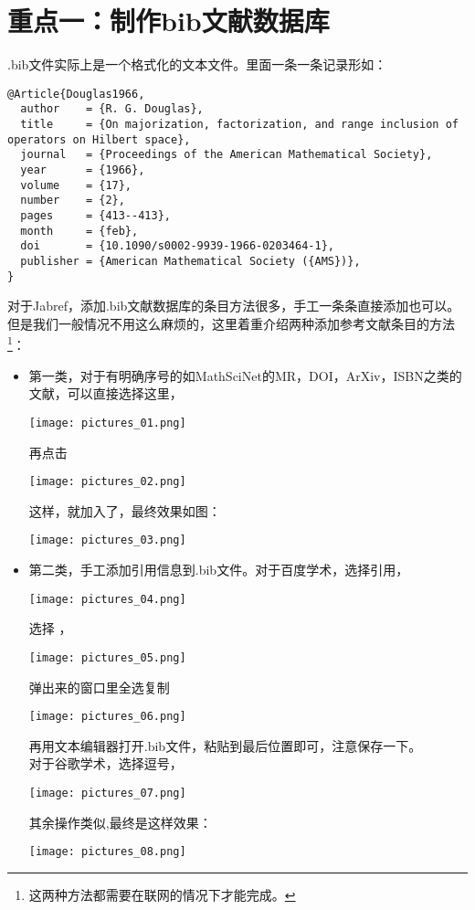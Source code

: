 \documentclass[cn,geye,cyan,normal,14pt]{elegantnote}
\begin{document}
\section{重点一：制作bib文献数据库}
.bib文件实际上是一个格式化的文本文件。里面一条一条记录形如：
\begin{lstlisting}
@Article{Douglas1966,
  author    = {R. G. Douglas},
  title     = {On majorization, factorization, and range inclusion of operators on Hilbert space},
  journal   = {Proceedings of the American Mathematical Society},
  year      = {1966},
  volume    = {17},
  number    = {2},
  pages     = {413--413},
  month     = {feb},
  doi       = {10.1090/s0002-9939-1966-0203464-1},
  publisher = {American Mathematical Society ({AMS})},
}
\end{lstlisting}
对于Jabref，添加.bib文献数据库的条目方法很多，手工一条条直接添加也可以。但是我们一般情况不用这么麻烦的，这里着重介绍两种添加参考文献条目的方法\footnote{这两种方法都需要在联网的情况下才能完成。}：
\clearpage
	\begin{itemize}
		\item 第一类，对于有明确序号的如MathSciNet的MR，DOI，ArXiv，ISBN之类的文献，可以直接选择这里，
			\begin{center}
				\texttt{[image: pictures\_01.png]}
			\end{center}
			再点击
			\begin{center}
				\texttt{[image: pictures\_02.png]}
			\end{center}
			这样，就加入了，最终效果如图：
			\begin{center}
			\texttt{[image: pictures\_03.png]}
			\end{center}
		\item 第二类，手工添加引用信息到.bib文件。对于百度学术，选择引用，
			\begin{center}
			\texttt{[image: pictures\_04.png]}
			\end{center}
			选择 \BibTeX，
			\begin{center}
			\texttt{[image: pictures\_05.png]}
			\end{center}
			弹出来的窗口里全选复制
			\begin{center}
			\texttt{[image: pictures\_06.png]}
			\end{center}
			再用文本编辑器打开.bib文件，粘贴到最后位置即可，注意保存一下。\\
对于谷歌学术，选择逗号，
			\begin{center}
			\texttt{[image: pictures\_07.png]}
			\end{center}
			其余操作类似,最终是这样效果：
			\begin{center}
			\texttt{[image: pictures\_08.png]}
			\end{center}
	\end{itemize}
\end{document}
